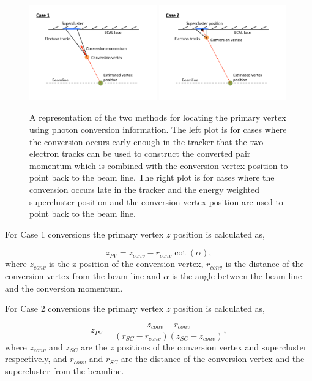 \begin{figure}
  \includegraphics[width=0.49\textwidth]{ch3_comm_anal_comps/plots/ConversionDiagCase1.pdf}
  \includegraphics[width=0.49\textwidth]{ch3_comm_anal_comps/plots/ConversionDiagCase2.pdf}
  \caption{A representation of the two methods for locating the primary vertex using photon conversion information. The left plot is for cases where the conversion occurs early enough in the tracker that the two electron tracks can be used to construct the converted pair momentum which is combined with the conversion vertex position to point back to the beam line. The right plot is for cases where the conversion occurs late in the tracker and the energy weighted supercluster position and the conversion vertex position are used to point back to the beam line.}
  \label{fig:conv_diags}
\end{figure}

For Case 1 conversions the primary vertex $z$ position is calculated as,

\begin{equation}
  z_{PV} = z_{conv} - r_{conv}\cot(\alpha),
\end{equation}
where $z_{conv}$ is the z position of the conversion vertex, $r_{conv}$ is the distance of the conversion vertex from the beam line and $\alpha$ is the angle between the beam line and the conversion momentum.

For Case 2 conversions the primary vertex $z$ position is calculated as,

\begin{equation}
  z_{PV} = \frac{z_{conv}-r_{conv}}{(r_{SC}-r_{conv})(z_{SC}-z_{conv})},
\end{equation}
where $z_{conv}$ and $z_{SC}$ are the $z$ positions of the conversion vertex and supercluster respectively, and $r_{conv}$ and $r_{SC}$ are the distance of the conversion vertex and the supercluster from the beamline.

